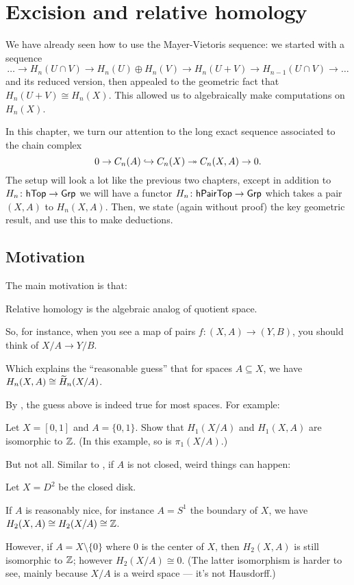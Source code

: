 \chapter{Excision and relative homology}
\label{ch:relative_hom}
We have already seen how to use the Mayer-Vietoris sequence:
we started with a sequence
\[ \dots \to H_n(U \cap V) \to H_n(U) \oplus H_n(V) \to H_n(U+V) \to H_{n-1}(U \cap V) \to \dots \]
and its reduced version,
then appealed to the geometric fact that $H_n(U+V) \cong H_n(X)$.
This allowed us to algebraically make computations on $H_n(X)$.

In this chapter, we turn our attention to the long exact
sequence associated to the chain complex
\[ 0 \to C_n(A) \hookrightarrow C_n(X) \twoheadrightarrow C_n(X,A) \to 0. \]
The setup will look a lot like the previous two chapters,
except in addition to $H_n \colon \mathsf{hTop} \to \mathsf{Grp}$
we will have a functor $H_n \colon \mathsf{hPairTop} \to \mathsf{Grp}$
which takes a pair $(X,A)$ to $H_n(X,A)$.
Then, we state (again without proof) the key geometric result,
and use this to make deductions.

\section{Motivation}

The main motivation is that:
\begin{moral}
	Relative homology is the algebraic analog of quotient space.
\end{moral}
So, for instance, when you see a map of pairs
$f \colon (X, A) \to (Y, B)$, you should think of $X/A \to Y/B$.

Which explains the ``reasonable guess''
that for spaces $A \subseteq X$, we have $H_n(X,A) \cong \widetilde H_n(X/A)$.

By , the guess above is indeed true for most spaces. For example:
\begin{ques}
	Let $X = [0, 1]$ and $A = \{ 0, 1 \}$. Show that $H_1(X/A)$ and $H_1(X, A)$
	are isomorphic to $\mathbb Z$. (In this example, so is $\pi_1(X/A)$.)
\end{ques}

But not all. Similar to , if $A$ is not closed, weird
things can happen:
\begin{example}
	Let $X = D^2$ be the closed disk.

	If $A$ is reasonably nice, for instance $A = S^1$ the boundary of $X$, we have $H_2(X, A) \cong
	H_2(X/A) \cong \mathbb Z$.

	However, if $A = X \setminus \{ 0 \}$ where $0$ is the center of $X$, then
	$H_2(X, A)$ is still isomorphic to $\mathbb Z$; however $H_2(X/A) \cong 0$. (The latter
	isomorphism is harder to see, mainly because $X/A$ is a weird space --- it's not Hausdorff.)
\end{example}


